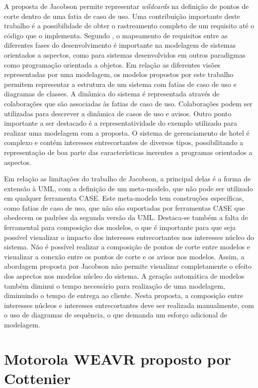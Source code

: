 A proposta de Jacobson permite representar \textit{wildcards} na definição de pontos de corte dentro de uma fatia de caso de uso. Uma contribuição
importante deste trabalho é a possibilidade de obter o rastreamento completo de um requisito até o código que o implementa. Segundo \cite{wimmer:2011:SUA:1978802.1978807}, 
o mapeamento de requisitos entre as diferentes fases do desenvolvimento é importante na modelagem de sistemas orientados a aspectos, como para
sistemas desenvolvidos em outros paradigmas como programação orientada a objetos. Em relação as diferentes visões representadas por uma modelagem, os
modelos propostos por este trabalho permitem representar a estrutura de um sistema com fatias de caso de uso e diagramas de classes. A dinâmica do sistema 
é representada através de colaborações que são associadas às fatias de caso de uso. Colaborações podem ser utilizadas para descrever a dinâmica de
casos de uso e avisos. Outro ponto importante a ser destacado é a representatividade do exemplo utilizado para realizar uma modelagem com a proposta. 
O sistema de gerenciamento de hotel é complexo e contém interesses entrecortantes de diversos tipos, possibilitando a representação de boa parte das
características inerentes a programas orientados a aspectos.

Em relação as limitações do trabalho de Jacobson, a principal delas é a forma de extensão à UML, com a definição de um meta-modelo, que não pode ser utilizado 
em qualquer ferramenta CASE. Este meta-modelo tem construções específicas, como fatias de caso de uso, que não são suportadas por ferramentas CASE que
obedecem os padrões da segunda versão da UML. Destaca-se também a falta de ferramental para composição dos modelos, o que é
importante para que seja possível visualizar o impacto dos interesses entrecortantes nos interesses núcleo do sistema. Não é possível realizar a
composição de pontos de corte entre modelos e visualizar a conexão entre os pontos de corte e os avisos nos modelos. Assim, a abordagem proposta por
Jacobson não permite visualizar completamente o efeito dos aspectos nos modelos núcleo do sistema. A geração automática de modelos também diminui o
tempo necessário para realização de uma modelagem, diminuindo o tempo de entrega ao cliente. Nesta proposta, a composição entre interesses núcleos e
interesses entrecortantes deve ser realizada manualmente, com o uso de diagramas de sequência, o que demanda um esforço adicional de modelagem.

\section{Motorola WEAVR proposto por Cottenier}

